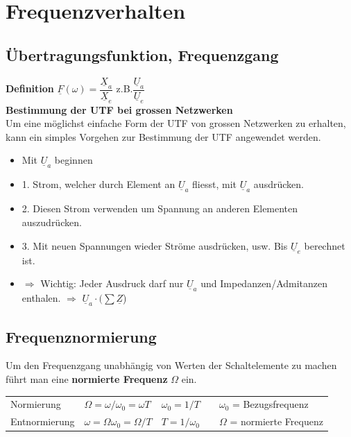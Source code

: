 \section{Frequenzverhalten}

	\subsection{Übertragungsfunktion, Frequenzgang}

		\textbf{Definition} 
		$\underline{F}(\omega) = \dfrac{\underline{X}_a}{\underline{X}_e}$ z.B.$\dfrac{\underline{U}_a}{\underline{U}_e}$\\
		
		\textbf{Bestimmung der UTF bei grossen Netzwerken}\\
		Um eine möglichst einfache Form der UTF von grossen Netzwerken zu erhalten, kann ein simples Vorgehen zur Bestimmung der UTF angewendet werden.
		
		\begin{itemize}
			\item Mit $\underline{U}_a$ beginnen
			\item 1. Strom, welcher durch Element an $\underline{U}_a$ fliesst, mit $\underline{U}_a$ ausdrücken.
			\item 2. Diesen Strom verwenden um Spannung an anderen Elementen auszudrücken.
			\item 3. Mit neuen Spannungen wieder Ströme ausdrücken, usw. Bis $\underline{U}_e$ berechnet ist.
			\item $\Rightarrow$ Wichtig: Jeder Ausdruck darf nur $\underline{U}_a$ und Impedanzen/Admitanzen enthalen. $\Rightarrow$ $\underline{U}_a \cdot (\sum \underline{Z}$)
		\end{itemize} 
		
	\subsection{Frequenznormierung}
		Um den Frequenzgang unabhängig von Werten der Schaltelemente zu machen führt man eine \textbf{normierte Frequenz} $\Omega$ ein.
		
		\begin{tabular}{lllll}
			Normierung &
			$\Omega = \omega/\omega_0 = \omega T$ &
			$\omega_0 = 1/T$ & &
			$\omega_0$ = Bezugsfrequenz\\
			
			Entnormierung &
			$ \omega = \Omega\omega_0 = \Omega / T$ &
			$ T = 1 / \omega_0$ & &
			$\Omega$ = normierte Frequenz 
		\end{tabular}
		
